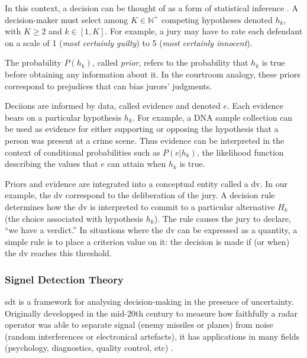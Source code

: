 In this context, a decision can be thought of as a form of statistical inference \cite{goldNeuralBasisDecision2007}. A decision-maker must select among $K \in \mathbb{N^{+}}$ competing hypotheses denoted $h_k$, with $K \ge 2$ and $k \in [1,K]$. For example, a jury may have to rate each defendant on a scale of 1 (\textit{most certainly guilty}) to 5 (\textit{most certainly innocent}).

The probability $P(h_k)$, called \textit{prior}, refers to the probability that $h_k$ is true before obtaining any information about it. In the courtroom analogy, these priors correspond to prejudices that can bias jurors’ judgments.

Deciions are informed by data, called evidence and denoted $e$. Each evidence bears on a particular hypothesis $h_k$. For example, a DNA sample collection can be used as evidence for either supporting or opposing the hypothesis that a person was present at a crime scene. Thus evidence can be interpreted in the context of conditional probabilities such as $P(e|h_k)$, the likelihood function describing the values that $e$ can attain when $h_k$ is true.

Priors and evidence  are integrated into a conceptual entity called a \acrfull{dv}. In our example, the \acrshort{dv} correspond to the deliberation of the jury. A decision rule determines how the \acrshort{dv} is interpreted to commit to a particular alternative $H_k$ (the choice associated with hypothesis $h_k$). The rule causes the jury to declare, “we have a verdict.” In situations where the \acrshort{dv} can be expressed as a quantity, a simple rule is to place a criterion value on it: the decision is made if (or when) the \acrshort{dv} reaches this threshold.


\subsubsection{Signel Detection Theory}

\acrfull{sdt} is a framework for analysing \gls{decision-making} in the presence of  \gls{uncertainty}. Originally developped in the mid-20th century to measure how faithfully a radar operator was able to separate signal (enemy missiles or planes) from noise (random interferences or electronical artefacts), it has applications in many fields (psychology, diagnostics, quality control, etc) \cite{green1966signal}.


